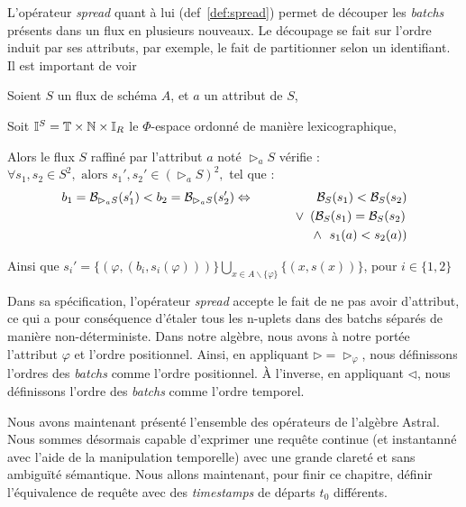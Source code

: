 L'opérateur \textit{spread} quant à lui (def~\ref{def:spread}) permet de découper les \textit{batchs} présents dans un flux en plusieurs nouveaux. Le découpage se fait sur l'ordre induit par ses attributs, par exemple, le fait de partitionner selon un identifiant. Il est important de voir 
\begin{defi}\label{def:spread}
Soient $S$ un flux de schéma $A$, et $a$ un attribut de $S$,

Soit $\mathbb{I}^S = \mathbb{T}\times\mathbb{N}\times \mathbb{I}_R$ le $\Phi$-espace ordonné de manière lexicographique,

Alors le flux $S$ raffiné par l'attribut $a$ noté $\rhd_{a} S$ vérifie :
$\forall s_1, s_2\in S^2, \textrm{ alors } s_1', s_2' \in (\rhd_a S)^2,$ tel que :
\begin{eqnarray*}
b_1=\mathcal{B}_{\rhd_a S}(s_1') < b_2=\mathcal{B}_{\rhd_a S}(s_2') &\Leftrightarrow & \mathcal{B}_S (s_1) < \mathcal{B}_S (s_2)\\ & & \quad \vee \ \left(\mathcal{B}_S (s_1) = \mathcal{B}_S (s_2)\right. \\ & & \quad\quad \quad\quad\wedge \ \left.s_1(a) < s_2(a)\right)
\end{eqnarray*}

Ainsi que $s_i' = \{(\varphi, (b_i,s_i(\varphi)))\}\bigcup_{x\in A\backslash\{\varphi\}}\{(x,s(x))\}$, pour $i\in\{1,2\}$
\end{defi}

Dans sa spécification, l'opérateur \textit{spread} accepte le fait de ne pas avoir d'attribut, ce qui a pour conséquence d'étaler tous les n-uplets dans des batchs séparés de manière non-déterministe. Dans notre algèbre, nous avons à notre portée l'attribut $\varphi$ et l'ordre positionnel. Ainsi, en appliquant $\rhd=\rhd_\varphi$, nous définissons l'ordres des \textit{batchs} comme l'ordre positionnel. À l'inverse, en appliquant $\lhd$, nous définissons l'ordre des \textit{batchs} comme l'ordre temporel.

Nous avons maintenant présenté l'ensemble des opérateurs de l'algèbre Astral. Nous sommes désormais capable d'exprimer une requête continue (et instantanné avec l'aide de la manipulation temporelle) avec une grande clareté et sans ambiguïté sémantique. Nous allons maintenant, pour finir ce chapitre, définir l'équivalence de requête avec des \textit{timestamps} de départs $t_0$ différents.
